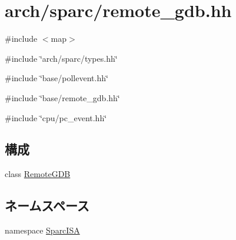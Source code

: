\hypertarget{arch_2sparc_2remote__gdb_8hh}{
\section{arch/sparc/remote\_\-gdb.hh}
\label{arch_2sparc_2remote__gdb_8hh}
}
{\ttfamily \#include $<$map$>$}\par
{\ttfamily \#include \char`\"{}arch/sparc/types.hh\char`\"{}}\par
{\ttfamily \#include \char`\"{}base/pollevent.hh\char`\"{}}\par
{\ttfamily \#include \char`\"{}base/remote\_\-gdb.hh\char`\"{}}\par
{\ttfamily \#include \char`\"{}cpu/pc\_\-event.hh\char`\"{}}\par
\subsection*{構成}
\begin{DoxyCompactItemize}
\item 
class \hyperlink{classSparcISA_1_1RemoteGDB}{RemoteGDB}
\end{DoxyCompactItemize}
\subsection*{ネームスペース}
\begin{DoxyCompactItemize}
\item 
namespace \hyperlink{namespaceSparcISA}{SparcISA}
\end{DoxyCompactItemize}
